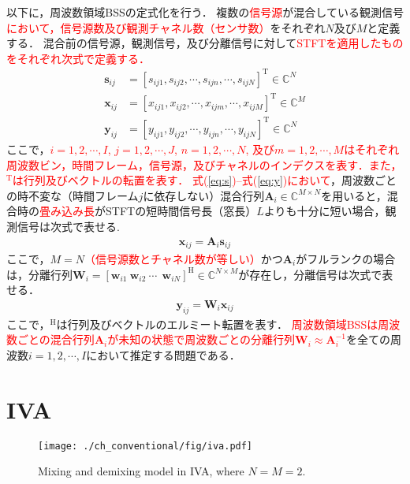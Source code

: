 以下に，周波数領域BSSの定式化を行う．
複数の\textcolor{red}{信号源}が混合している観測信号\textcolor{red}{において，信号源数及び観測チャネル数（センサ数）}をそれぞれ$N$及び$M$と定義する．
混合前の信号源，観測信号，及び分離信号に対して\textcolor{red}{STFTを適用したものをそれぞれ次式で定義する．}
\begin{align}
\bm{s}_{ij} &= [s_{ij1}, s_{ij2}, \cdots, s_{ijn}, \cdots, s_{ijN}]^{\mathrm{T}} \in \mathbb{C}^{N} \label{eq:s} \\
\bm{x}_{ij} &= [x_{ij1}, x_{ij2}, \cdots, x_{ijm}, \cdots, x_{ijM}]^{\mathrm{T}} \in \mathbb{C}^{M} \label{eq:x} \\
\bm{y}_{ij} &= [y_{ij1}, y_{ij2}, \cdots, y_{ijn}, \cdots, y_{ijN}]^{\mathrm{T}} \in \mathbb{C}^{N} \label{eq:y}
\end{align}
ここで，\textcolor{red}{$i=1, 2,  \cdots, I$, $j=1, 2,  \cdots, J$, $n=1, 2,  \cdots, N$, 及び$m=1, 2, \cdots, M$はそれぞれ周波数ビン，時間フレーム，信号源，及びチャネルのインデクスを表す．また，$^{\mathrm{T}}$は行列及びベクトルの転置を表す．}
\textcolor{red}{式(\ref{eq:s})--式(\ref{eq:y})において}，周波数ごとの時不変な（時間フレーム$j$に依存しない）混合行列$\bm{A}_i \in \mathbb{C}^{M\times N}$を用いると，混合時の\textcolor{red}{畳み込み長}がSTFTの短時間信号長（窓長）$L$よりも十分に短い場合，観測信号は次式で表せる.
\begin{align}
  \bm{x}_{ij} = \bm{A}_i \bm{s}_{ij} \label{eq:xas}
\end{align}
ここで，$M=N$\textcolor{red}{（信号源数とチャネル数が等しい）}かつ$\bm{A}_i$がフルランクの場合は，分離行列$\bm{W}_{i} = [\bm{w}_{i1}~\bm{w}_{i2}~\cdots~ ~\bm{w}_{iN}]^{\mathrm{H}} \in \mathbb{C}^{N \times M} $が存在し，分離信号は次式で表せる．
\begin{align}
  \bm{y}_{ij} = \bm{W}_i \bm{x}_{ij} \label{eq:ywj}
\end{align}
ここで，$^{\mathrm{H}}$は行列及びベクトルのエルミート転置を表す．
\textcolor{red}{周波数領域BSSは周波数ごとの混合行列$\bm{A}_i$が未知の状態で周波数ごとの分離行列$\bm{W}_{i} \approx \bm{A}_i^{-1}$}を全ての周波数$i=1, 2, \cdots, I$において推定する問題である．


\section{IVA}
\label{sec:conv:iva}
\begin{figure}[t]
\centering
\texttt{[image: ./ch\_conventional/fig/iva.pdf]}
\caption{Mixing and demixing model in IVA, where $N=M=2$.}
\label{fig:ivamodel}
\end{figure}

